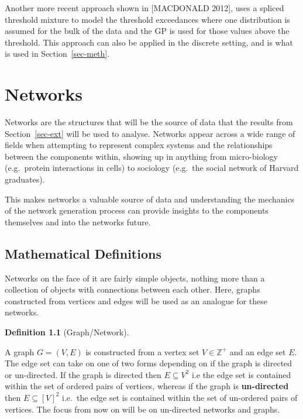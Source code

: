 \documentclass[
  10pt,
  a4paper,
]{scrreprt}
\theoremstyle{definition}
\newtheorem{definition}{Definition}[section]
\theoremstyle{plain}
\theoremstyle{remark}
\begin{document}
{Another more recent approach shown in {[}MACDONALD 2012{]}, uses a
spliced threshold mixture to model the threshold exceedances where one
distribution is assumed for the bulk of the data and the GP is used for
those values above the threshold. This approach can also be applied in
the discrete setting, and is what is used in Section~\ref{sec-meth}.

\hypertarget{networks}{%
\chapter{Networks}\label{networks}}

Networks are the structures that will be the source of data that the
results from Section~\ref{sec-ext} will be used to analyse. Networks
appear across a wide range of fields when attempting to represent
complex systems and the relationships between the components within,
showing up in anything from micro-biology (e.g.~protein interactions in
cells) to sociology (e.g.~the social network of Harvard graduates).

This makes networks a valuable source of data and understanding the
mechanics of the network generation process can provide insights to the
components themselves and into the networks future.

\hypertarget{mathematical-definitions}{%
\section{Mathematical Definitions}\label{mathematical-definitions}}

Networks on the face of it are fairly simple objects, nothing more than
a collection of objects with connections between each other. Here,
graphs constructed from vertices and edges will be used as an analogue
for these networks.

\begin{definition}[Graph/Network]\protect\hypertarget{def-net}{}\label{def-net}

A graph \(G = (V,E)\) is constructed from a vertex set
\(V\in\mathbb Z^+\) and an edge set \(E\). The edge set can take on one
of two forms depending on if the graph is directed or un-directed. If
the graph is directed then \(E\subseteq V^2\) i.e the edge set is
contained within the set of ordered pairs of vertices, whereas if the
graph is \textbf{un-directed} then \(E\subseteq [V]^2\) i.e.~the edge
set is contained within the set of un-ordered pairs of vertices. The
focus from now on will be on un-directed networks and graphs.


\end{definition}}
\end{document}
